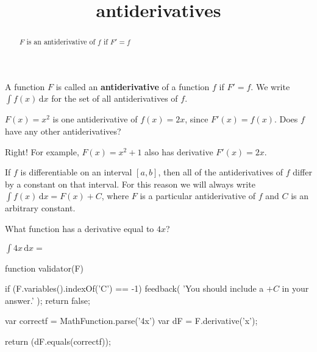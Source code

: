 \documentclass{ximera}
\title{antiderivatives}
\begin{document}
\begin{abstract}
  $F$ is an antiderivative of $f$ if $F'=f$
\end{abstract}

\maketitle

\begin{definition}
	A function $F$ is called an \textbf{antiderivative} of a function $f$ if $F' = f$.  We write $\displaystyle \int \! f(x) \, \mathrm{d}x$ for the set of all antiderivatives of $f$.
\end{definition}

\begin{question}
	$F(x) = x^2$ is one antiderivative of $f(x) = 2x$, since $F'(x) = f(x)$.  Does $f$ have any other antiderivatives?
\begin{solution}
	 \begin{multipleChoice}
    	\end{multipleChoice}  
  \end{solution}
  
  Right!  For example, $F(x) = x^2+1$ also has derivative $F'(x) = 2x$.
\end{question}

\begin{theorem}
	If $f$ is differentiable on an interval $[a,b]$, then all of the antiderivatives of $f$ differ by a constant on that interval.  For this reason we will always write $\displaystyle \int \! f(x) \, \mathrm{d}x  = F(x)+C$, where $F$ is a particular antiderivative of $f$ and $C$ is an arbitrary constant.
\end{theorem}

\begin{question}
	\begin{hint}
		What function has a derivative equal to $4x$?
	\end{hint}
 	$\displaystyle \int 4x \, \mathrm{d}x = $ 
	\begin{expression-answer}
 function validator(F) {
   if (F.variables().indexOf('C') == -1) {
     feedback( 'You should include a $+C$ in your answer.' );
     return false;
   }
   
   var correctf = MathFunction.parse('4x')
   var dF = F.derivative('x');
   
   return (dF.equals(correctf));
 }
\end{expression-answer}	
	
\end{question}
\end{document}
